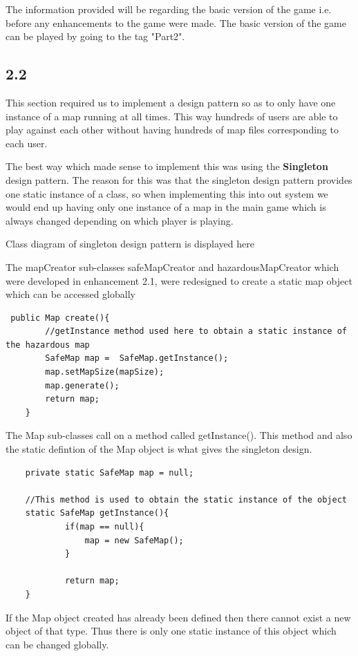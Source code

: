 \documentclass[a4paper,12pt]{extarticle}
\begin{document}
The information provided will be regarding the basic version of the game i.e. before any enhancements to the game were made. The basic version of the game can be played by going to the tag "Part2".

\subsection{2.2}

This section required us to implement a design pattern so as to only have one instance of a map running at all times. This way hundreds of users are able to play against each other without having hundreds of map files corresponding to each user.

The best way which made sense to implement this was using the \textbf{Singleton} design pattern. The reason for this was that the singleton design pattern provides one static instance of a class, so when implementing this into out system we would end up having only one instance of a map in the main game which is always changed depending on which player is playing.

Class diagram of singleton design pattern is displayed here

The mapCreator sub-classes safeMapCreator and hazardousMapCreator which were developed in enhancement 2.1, were redesigned to create a static map object which can be accessed globally 

\begin{lstlisting}
 public Map create(){
        //getInstance method used here to obtain a static instance of the hazardous map
        SafeMap map =  SafeMap.getInstance();
        map.setMapSize(mapSize);
        map.generate();
        return map;
    }
\end{lstlisting}

The Map sub-classes call on a method called getInstance(). This method and also the static defintion of the Map object is what gives the singleton design.

\begin{lstlisting}
    private static SafeMap map = null;
    
    //This method is used to obtain the static instance of the object
    static SafeMap getInstance(){
            if(map == null){
                map = new SafeMap();
            }

            return map;
    }
\end{lstlisting}

If the Map object created has already been defined then there cannot exist a new object of that type. Thus there is only one static instance of this object which can be changed globally.
\end{document}
